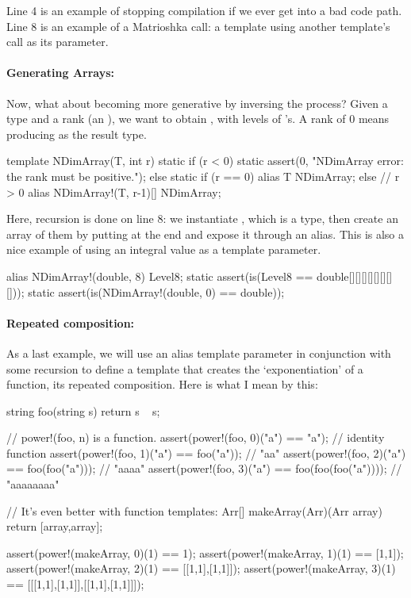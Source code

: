 Line 4 is an example of  stopping compilation if we ever get into a bad code path. Line 8 is an example of a Matrioshka call: a template using another template's call as its parameter.

\paragraph{Generating Arrays:}

Now, what about becoming more generative by inversing the process? Given a type  and a rank  (an ), we want to obtain , with  levels of \DD{[]}'s. A rank of 0 means producing  as the result type.

\begin{dcode}
template NDimArray(T, int r)
{
    static if (r < 0)
        static assert(0, "NDimArray error: the rank must be positive.");
    else static if (r == 0)
        alias T NDimArray;
    else // r > 0
        alias NDimArray!(T, r-1)[] NDimArray;
}
\end{dcode}

Here, recursion is done on line 8: we instantiate , which is a type, then create an array of them by putting \DD{[]} at the end and expose it through an alias. This is also a nice example of using an integral value as a template parameter.

\begin{dcode}
alias NDimArray!(double, 8) Level8;
static assert(is(Level8 == double[][][][][][][][]));
static assert(is(NDimArray!(double, 0) == double));
\end{dcode}

\paragraph{Repeated composition:} 

As a last example, we will use an alias template parameter in conjunction with some  recursion to define a template that creates the `exponentiation' of a function, its repeated composition. Here is what I mean by this:

\begin{dcode}
string foo(string s) { return s ~ s;}

// power!(foo, n) is a function.
assert(power!(foo, 0)("a") == "a");                // identity function
assert(power!(foo, 1)("a") == foo("a"));           // "aa"
assert(power!(foo, 2)("a") == foo(foo("a")));      // "aaaa"
assert(power!(foo, 3)("a") == foo(foo(foo("a")))); // "aaaaaaaa"

// It's even better with function templates:
Arr[] makeArray(Arr)(Arr array) { return [array,array];}

assert(power!(makeArray, 0)(1) == 1);
assert(power!(makeArray, 1)(1) == [1,1]);
assert(power!(makeArray, 2)(1) == [[1,1],[1,1]]);
assert(power!(makeArray, 3)(1) == [[[1,1],[1,1]],[[1,1],[1,1]]]);
\end{dcode}

